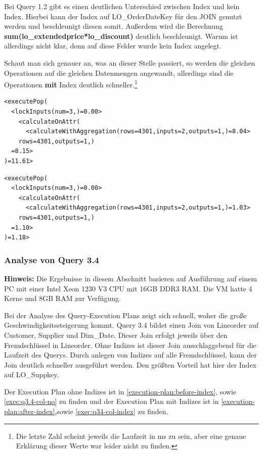 Bei Query 1.2 gibt es einen deutlichen Unterschied zwischen Index und kein Index. Hierbei kann der Index auf LO\_OrderDateKey für den JOIN genutzt werden und beschleunigt diesen somit.
Außerdem wird die Berechnung \textbf{sum(lo\_extendedprice*lo\_discount)} deutlich beschleunigt. Warum ist allerdings nicht klar, denn auf diese Felder wurde kein Index angelegt.


Schaut man sich genauer an, was an dieser Stelle passiert, so werden die gleichen Operationen auf die gleichen Datenmengen angewandt, allerdings sind die Operationen \textbf{mit} Index deutlich schneller.\footnote{Die letzte Zahl scheint jeweils die Laufzeit in ms zu sein, aber eine genaue Erklärung dieser Werte war leider nicht zu finden.}
\begin{lstlisting}[breaklines, caption=Ohne Index]
<executePop(
  <lockInputs(num=3,)=0.00>
    <calculateOnAttr(
      <calculateWithAggregation(rows=4301,inputs=2,outputs=1,)=8.04>
    rows=4301,outputs=1,)
  =8.15>
)=11.61>
\end{lstlisting}

\begin{lstlisting}[breaklines, caption=Mit Index]
<executePop(
  <lockInputs(num=3,)=0.00>
    <calculateOnAttr(
      <calculateWithAggregation(rows=4301,inputs=2,outputs=1,)=1.03>
    rows=4301,outputs=1,)
  =1.10>
)=1.18>
\end{lstlisting}

\subsubsection{Analyse von Query 3.4}
\textbf{Hinweis:} Die Ergebnisse in diesem Abschnitt basieren auf Ausführung auf einem PC mit einer Intel Xeon 1230 V3 CPU mit 16GB DDR3 RAM. Die VM hatte 4 Kerne und 8GB RAM zur Verfügung.

Bei der Analyse des Query-Execution Plans zeigt sich schnell,
woher die große Geschwindigkeitssteigerung kommt.
Query 3.4 bildet einen Join von Lineorder auf Customer,
Supplier und Dim\_Date. 
Dieser Join erfolgt jeweils über den Fremdschlüssel in Lineorder.
Ohne Indizes ist dieser Join ausschlaggebend für die Laufzeit des Querys.
Durch anlegen von Indizes auf alle Fremdschlüssel,
kann der Join deutlich schneller ausgeführt werden.
Den größten Vorteil hat hier der Index auf LO\_Suppkey.

Der Execution Plan ohne Indizes ist in \autoref{execution-plan:before-index}, sowie \autoref{exec:q3.4-col-no}
zu finden und der Execution Plan mit Indizes ist in \autoref{execution-plan:after-index},sowie \autoref{exec:q34-col-index} zu finden.

